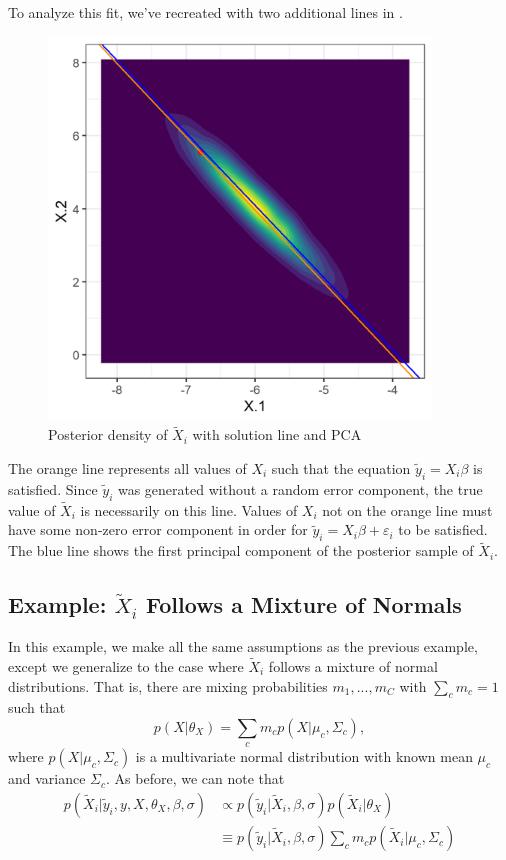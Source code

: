 \documentclass{article}
\newcommand{\ep}{\varepsilon}
\newcommand{\ty}{\tilde{y}_i}
\newcommand{\tX}{\tilde{X}_i}
\begin{document}
To analyze this fit, we've recreated  with two additional lines in .
\begin{figure}
	\centering
	\includegraphics[width=4in]{../examples/lm-normal-fixed/images/density-posterior-inverse-pca.png}
	\caption{Posterior density of $\tX$ with solution line and PCA}
	\label{fig:lm-normal-posterior-inverse-pca}
\end{figure}
The orange line represents all values of $X_i$ such that the equation $\ty = X_i \beta$ is satisfied. Since $\ty$ was generated without a random error component, the true value of $\tX$ is necessarily on this line. Values of $X_i$ not on the orange line must have some non-zero error component in order for $\ty = X_i \beta + \ep_i$ to be satisfied. The blue line shows the first principal component of the posterior sample of $\tX$.

\subsection*{Example: $\tX$ Follows a Mixture of Normals}

In this example, we make all the same assumptions as the previous example, except we generalize to the case where $\tX$ follows a mixture of normal distributions. That is, there are mixing probabilities $m_1, ..., m_C$ with $\sum_c m_c = 1$ such that
\begin{equation}
	p(X | \theta_X) = \sum_c m_c p(X | \mu_c, \Sigma_c),
\end{equation}
where $p(X | \mu_c, \Sigma_c)$ is a multivariate normal distribution with known mean $\mu_c$ and variance $\Sigma_c$. As before, we can note that 
\begin{align}
	\label{eq:conditional-posterior}
	\nonumber
	p(\tX | \ty, y, X, \theta_X, \beta, \sigma) &\propto p(\ty | \tX, \beta, \sigma) p(\tX | \theta_X) \\
	& \equiv p(\ty | \tX, \beta, \sigma) \sum_c m_c p(\tX | \mu_c, \Sigma_c)
\end{align}
\end{document}
